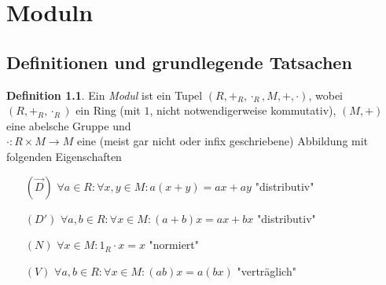 \documentclass[
twoside=semi,
fontsize=12,
DIV=12, 
cleardoublepage=current,
leqno,
headings=optiontoheadandtoc, 
toc=idx
]{scrbook}
\theoremstyle{definition}
\newtheorem{definition}{Definition}[section]
\begin{document}
	\pagestyle{empty}
	\tableofcontents
	\mainmatter
	\chapter[tocentry={Moduln}]{Moduln}
	\pagestyle{scrheadings}
	
	\section{Definitionen und grundlegende Tatsachen}
	\setcounter{chapter}{1}
	\setcounter{section}{1}
	\begin{definition}\label{1.1.1}\hfill\newline
		Ein \emph{Modul} ist ein Tupel $(R, +_R, \cdot_R, M, +, \cdot)$, wobei $(R, +_R, \cdot_R)$ ein Ring (mit $1$, nicht notwendigerweise kommutativ), $(M, +)$ eine abelsche Gruppe und \\\noindent$\cdot:R\times M \to M$ eine (meist gar nicht oder infix geschriebene) Abbildung mit folgenden Eigenschaften
		
		\begin{itemize}
			\item[$(\overset{\rightarrow}{D})$] $\forall a \in R: \forall x, y \in M: a(x + y) = ax + ay$ \hfill "distributiv"
			
			\item[$(D')$] $\forall a, b \in R: \forall x \in M: (a+b)x = ax + bx$ \hfill "distributiv"
			
			\item[$(N)$] $\forall x \in M: 1_R \cdot x = x$ \hfill "normiert"
			
			\item[$(V)$] $\forall a, b \in R: \forall x \in M: (ab)x = a(bx)$ \hfill "vertr\"aglich"
		\end{itemize}
	\end{definition}
	
\end{document}
